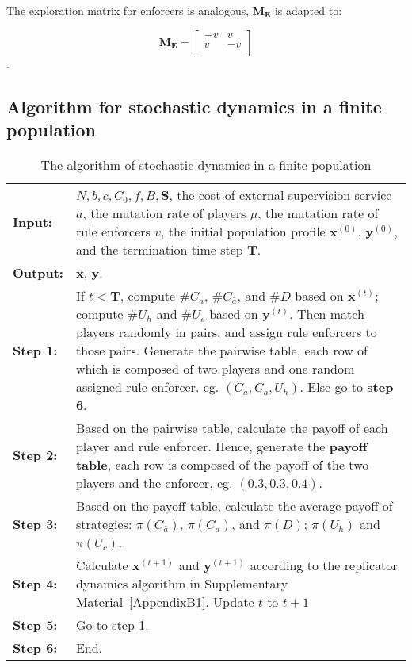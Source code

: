 \documentclass[letterpaper,10pt]{article}
\numberwithin{equation}{section}
\begin{document}
\noindent The exploration matrix for enforcers is analogous, $ \mathbf{M_{E}} $ is adapted to:

\begin{equation}
\mathbf{M_{E}} = 
    \begin{bmatrix}
    -v & v \\
    v & -v \\
    \end{bmatrix}
\end{equation}.

\subsection{Algorithm for stochastic dynamics in a finite population}\label{AppendixB2}
\begin{longtable}{p{} p{}}
    \caption{The algorithm of stochastic dynamics in a finite population}
	\endfirsthead
    \endhead
		\hline
		\textbf{Input:} & $ N, b, c, C_{0}, f, B, \mathbf{S} $, the cost of external supervision service $ a $, the mutation rate of players $ \mu $, the mutation rate of rule enforcers $ v $, the initial population profile $ \mathbf{x}^{(0)} $, $ \mathbf{y}^{(0)} $, and the termination time step $ \mathbf{T} $.\\
		\textbf{Output:} & $ \mathbf{x} $, $ \mathbf{y} $.\\
		\textbf{Step 1:} & \makecell[tl]{If $ t < \mathbf{T} $, compute \#$  C_{a} $, \#$  C_{\bar{a}}$, and \#$  D $ based on $ \mathbf{x}^{(t)} $; compute \#$  U_h $ and \\ \#$  U_c $ based on $ \mathbf{y}^{(t)} $.\\
		Then match players randomly in pairs, and assign rule enforcers to those pairs.\\
		Generate the pairwise table, each row of which is composed of two players\\
		and one random assigned rule enforcer. eg. $ (C_{\bar{a}}, C_{\bar{a}}, U_{h}) $.\\
		Else go to \textbf{step 6}.}\\
		\textbf{Step 2:} & Based on the pairwise table, calculate the payoff of each player and rule enforcer. Hence, generate the \textbf{payoff table}, each row is composed of the payoff of the two players and the enforcer, eg. $ (0.3, 0.3, 0.4) $.\\
		\textbf{Step 3:} & Based on the payoff table, calculate the average payoff of strategies: $ \pi (C_{\bar{a}}) $,
		$ \pi (C_{a}) $, and $ \pi (D) $; $ \pi (U_{h}) $ and $ \pi (U_{c})$.\\
		\textbf{Step 4:} & Calculate $ \mathbf{x}^{(t+1)} $ and $ \mathbf{y}^{(t+1)} $ according to the replicator dynamics algorithm in Supplementary Material~\ref{AppendixB1}. Update $ t $ to $ t+1 $\\
		\textbf{Step 5:} & Go to step 1.\\
		\textbf{Step 6:} & End.\\
		\bottomrule
\end{longtable}
\end{document}

